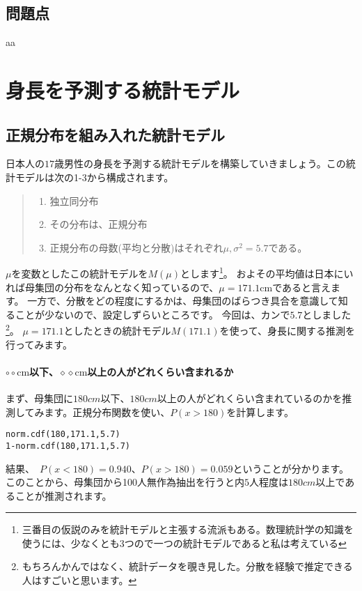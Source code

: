 \documentclass[a4paper,11pt,dvipdfmx]{jsarticle}
\begin{document}
\subsection{問題点}
aa


\clearpage
\section{身長を予測する統計モデル}
\subsection{正規分布を組み入れた統計モデル}
日本人の$17$歳男性の身長を予測する統計モデルを構築していきましょう。この統計モデルは次の1-3から構成されます。
\begin{quote}
    \begin{enumerate}[(1)]
    \item 独立同分布
    \item その分布は、正規分布
    \item 正規分布の母数(平均と分散)はそれぞれ$\mu,\sigma^2=5.7$である。
    \end{enumerate}
\end{quote}

$\mu$を変数としたこの統計モデルを$M(\mu)$とします\footnote{三番目の仮説のみを統計モデルと主張する流派もある\cite{塩見_正衛2021}。数理統計学の知識を使うには、少なくとも$3$つので一つの統計モデルであると私は考えている}。
およその平均値は日本にいれば母集団の分布をなんとなく知っているので、$\mu=171.1\mathrm{cm}$であると言えます。
一方で、分散をどの程度にするかは、母集団のばらつき具合を意識して知ることが少ないので、設定しずらいところです。
今回は、カンで$5.7$としました\footnote{もちろんかんではなく、統計データを覗き見した。分散を経験で推定できる人はすごいと思います。}。
$\mu=171.1$としたときの統計モデル$M(171.1)$を使って、身長に関する推測を行ってみます。

\paragraph{ $\circ\circ \mathrm{cm}$以下、$\diamond\diamond \mathrm{cm}$以上の人がどれくらい含まれるか}
まず、母集団に$180cm$以下、$180cm$以上の人がどれくらい含まれているのかを推測してみます。正規分布関数を使い、$P(x>180)$を計算します。

\begin{lstlisting}
norm.cdf(180,171.1,5.7)
1-norm.cdf(180,171.1,5.7)
\end{lstlisting}
結果、　$P(x<180)=0.940$、$P(x>180)=0.059$ということが分かります。
このことから、母集団から100人無作為抽出を行うと内$5$人程度は$180cm$以上であることが推測されます。
\end{document}
